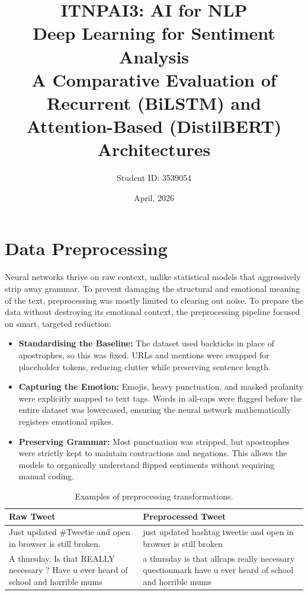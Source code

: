 \documentclass[12pt, a4paper]{article}
\title{
    \Large \textbf{ITNPAI3: AI for NLP} \\
    \vspace{0.5cm}
    \LARGE \textbf{Deep Learning for Sentiment Analysis} \\
    \vspace{0.25cm}
    \large A Comparative Evaluation of Recurrent (BiLSTM) and Attention-Based (DistilBERT) Architectures
}
\author{Student ID: 3539054}
\date{April, 2026}
\begin{document}
\maketitle

\section{Data Preprocessing}

\quad Neural networks thrive on raw context, unlike statistical models that aggressively strip away grammar. To prevent damaging the structural and emotional meaning of the text, preprocessing was mostly limited to clearing out noise. To prepare the data without destroying its emotional context, the preprocessing pipeline focused on smart, targeted reduction:

\begin{itemize}
    \item \textbf{Standardising the Baseline:} The dataset used backticks in place of apostrophes, so this was fixed. URLs and mentions were swapped for placeholder tokens, reducing clutter while preserving sentence length.

    \item \textbf{Capturing the Emotion:} Emojis, heavy punctuation, and masked profanity were explicitly mapped to text tags. Words in all-caps were flagged before the entire dataset was lowercased, ensuring the neural network mathematically registers emotional spikes.

    \item \textbf{Preserving Grammar:} Most punctuation was stripped, but apostrophes were strictly kept to maintain contractions and negations. This allows the models to organically understand flipped sentiments without requiring manual coding.
\end{itemize}

\begin{table}[h!]
    \centering
    \renewcommand{\arraystretch}{1.5}
    \begin{tabular}{|p{}|p{}|}
        \hline
        \textbf{Raw Tweet} & \textbf{Preprocessed Tweet} \\ \hline
        
        Just updated \#Tweetie and open in browser is still broken. & just updated hashtag tweetie and open in browser is still broken \\ \hline
        
        A thursday. Is that REALLY necessary ? Have u ever heard of school and horrible mums & a thursday is that allcaps really necessary questionmark have u ever heard of school and horrible mums \\ \hline
    \end{tabular}
    \caption{Examples of preprocessing transformations.}
    \label{tab:preprocessing_examples}
\end{table}
\end{document}
